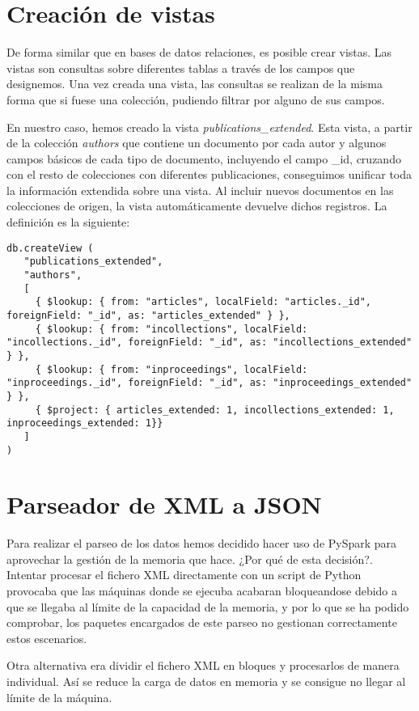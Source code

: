 \section{Creación de vistas}\label{sec:parser}

De forma similar que en bases de datos relaciones, es posible crear vistas. Las vistas son consultas sobre diferentes tablas a través de los campos que designemos. Una vez creada una vista, las consultas se realizan de la misma forma que si fuese una colección, pudiendo filtrar por alguno de sus campos.

En nuestro caso, hemos creado la vista \textit{publications\_extended}. Esta vista, a partir de la colección \textit{authors} que contiene un documento por cada autor y algunos campos básicos de cada tipo de documento, incluyendo el campo \_id, cruzando con el resto de colecciones con diferentes publicaciones, conseguimos unificar toda la información extendida sobre una vista. Al incluir nuevos documentos en las colecciones de origen, la vista automáticamente devuelve dichos registros. La definición es la siguiente:

\begin{verbatim}
db.createView (
   "publications_extended",
   "authors",
   [
     { $lookup: { from: "articles", localField: "articles._id", foreignField: "_id", as: "articles_extended" } },
     { $lookup: { from: "incollections", localField: "incollections._id", foreignField: "_id", as: "incollections_extended" } },
     { $lookup: { from: "inproceedings", localField: "inproceedings._id", foreignField: "_id", as: "inproceedings_extended" } },
     { $project: { articles_extended: 1, incollections_extended: 1, inproceedings_extended: 1}}
   ]
)
\end{verbatim}


\section{Parseador de XML a JSON}\label{sec:parser}

Para realizar el parseo de los datos hemos decidido hacer uso de PySpark para aprovechar la gestión de la memoria que hace. ¿Por qué de esta decisión?. Intentar procesar el fichero \gls{XML} directamente con un script de Python provocaba que las máquinas donde se ejecuba acabaran bloqueandose debido a que se llegaba al límite de la capacidad de la memoria, y por lo que se ha podido comprobar, los paquetes encargados de este parseo no gestionan correctamente estos escenarios.

Otra alternativa era dividir el fichero XML en bloques y procesarlos de manera individual. Así se reduce la carga de datos en memoria y se consigue no llegar al límite de la máquina. 

